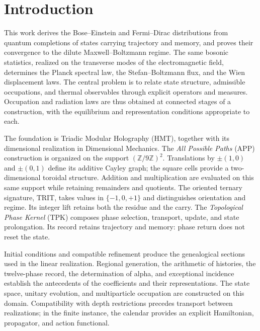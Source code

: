 \section*{Introduction}
{}
\label{v:presentacion}
This work derives the Bose--Einstein and Fermi--Dirac distributions
from quantum completions of states carrying trajectory and memory,
and proves their convergence to the dilute Maxwell--Boltzmann regime.
The same bosonic statistics, realized on the transverse modes of the
electromagnetic field, determines the Planck spectral law, the
Stefan--Boltzmann flux, and the Wien displacement laws. The central
problem is to relate state structure, admissible occupations, and thermal
observables through explicit operators and measures. Occupation and
radiation laws are thus obtained at connected stages of a construction,
with the equilibrium and representation conditions appropriate to each.

The foundation is Triadic Modular Holography (HMT), together with its
dimensional realization in Dimensional Mechanics. The \emph{All Possible
Paths} (APP) construction is organized on the support
\((\mathbb Z/9\mathbb Z)^2\). Translations by
\(\pm(1,0)\) and \(\pm(0,1)\) define its additive Cayley graph;
the square cells provide a two-dimensional toroidal structure.
Addition and multiplication are evaluated on this same support while
retaining remainders and quotients. The oriented ternary signature,
TRIT, takes values in \(\{-1,0,+1\}\) and distinguishes orientation and
regime. Its integer lift retains both the residue and the carry.
The \emph{Topological Phase Kernel} (TPK)
composes phase selection, transport, update, and state prolongation.
Its record retains trajectory and memory: phase return does not reset
the state.

Initial conditions and compatible refinement produce the genealogical
sections used in the linear realization. Regional generation, the
arithmetic of histories, the twelve-phase record, the determination of
alpha, and exceptional incidence establish the antecedents of the
coefficients and their representations. The state space, unitary
evolution, and multiparticle occupation are constructed on this domain.
Compatibility with depth restrictions precedes transport between
realizations; in the finite instance, the calendar provides an explicit
Hamiltonian, propagator, and action functional.

